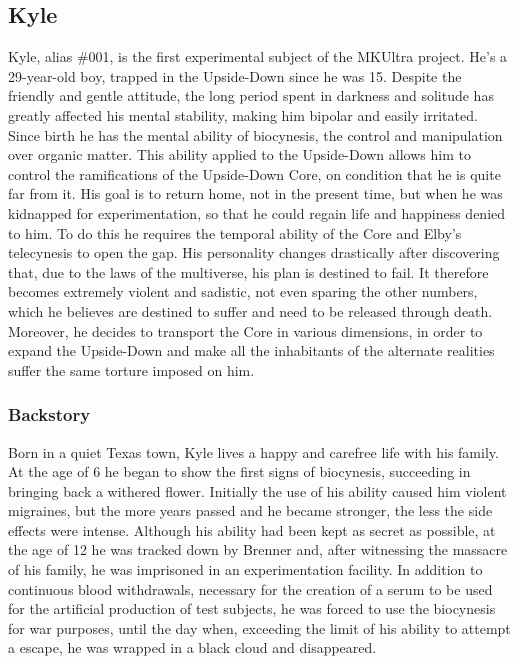 \subsection{Kyle}
Kyle, alias \#001, is the first experimental subject of the MKUltra project. He's a 29-year-old boy, trapped in the Upside-Down since he was 15.
Despite the friendly and gentle attitude, the long period spent in darkness and solitude has greatly affected his mental stability, making him bipolar 
and easily irritated. Since birth he has the mental ability of biocynesis, the control and manipulation over organic matter. This ability applied to the 
Upside-Down allows him to control the ramifications of the Upside-Down Core, on condition that he is quite far from it.
His goal is to return home, not in the present time, but when he was kidnapped for experimentation, so that he could regain life and happiness denied to him.
To do this he requires the temporal ability of the Core and Elby's telecynesis to open the gap.
His personality changes drastically after discovering that, due to the laws of the multiverse, his plan is destined to fail. It therefore becomes extremely violent and sadistic, not even sparing the other numbers, which he believes are destined to suffer and need to be released through death. Moreover, he decides
 to transport the Core in various dimensions, in order to expand the Upside-Down and make all the inhabitants of the alternate realities suffer the same torture imposed on him.

\subsubsection{Backstory}
Born in a quiet Texas town, Kyle lives a happy and carefree life with his family. At the age of 6 he began to show the first signs of biocynesis, succeeding in bringing back a withered flower. Initially the use of his ability caused him violent migraines, but the more years passed and he became stronger, the less the side effects were intense. Although his ability had been kept as secret as possible, at the age of 12 he was tracked down by Brenner and, after witnessing the massacre of his family, he was imprisoned in an experimentation facility. In addition to continuous blood withdrawals, necessary for the creation of a serum to be used for the artificial production of test subjects, he was forced to use the biocynesis for war purposes, until the day when, exceeding the limit of his ability to attempt a escape, he was wrapped in a black cloud and disappeared.

